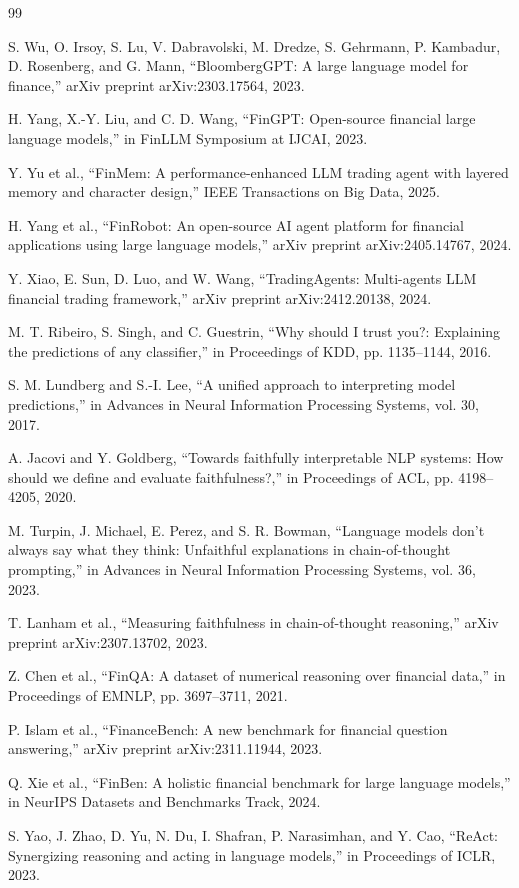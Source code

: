 \documentclass[12pt,a4paper]{article}
\begin{document}
\begin{thebibliography}{99}

S. Wu, O. Irsoy, S. Lu, V. Dabravolski, M. Dredze, S. Gehrmann, P. Kambadur, D. Rosenberg, and G. Mann, ``BloombergGPT: A large language model for finance,'' arXiv preprint arXiv:2303.17564, 2023.

H. Yang, X.-Y. Liu, and C. D. Wang, ``FinGPT: Open-source financial large language models,'' in FinLLM Symposium at IJCAI, 2023.

Y. Yu et al., ``FinMem: A performance-enhanced LLM trading agent with layered memory and character design,'' IEEE Transactions on Big Data, 2025.

H. Yang et al., ``FinRobot: An open-source AI agent platform for financial applications using large language models,'' arXiv preprint arXiv:2405.14767, 2024.

Y. Xiao, E. Sun, D. Luo, and W. Wang, ``TradingAgents: Multi-agents LLM financial trading framework,'' arXiv preprint arXiv:2412.20138, 2024.

M. T. Ribeiro, S. Singh, and C. Guestrin, ``Why should I trust you?: Explaining the predictions of any classifier,'' in Proceedings of KDD, pp. 1135--1144, 2016.

S. M. Lundberg and S.-I. Lee, ``A unified approach to interpreting model predictions,'' in Advances in Neural Information Processing Systems, vol. 30, 2017.

A. Jacovi and Y. Goldberg, ``Towards faithfully interpretable NLP systems: How should we define and evaluate faithfulness?,'' in Proceedings of ACL, pp. 4198--4205, 2020.

M. Turpin, J. Michael, E. Perez, and S. R. Bowman, ``Language models don't always say what they think: Unfaithful explanations in chain-of-thought prompting,'' in Advances in Neural Information Processing Systems, vol. 36, 2023.

T. Lanham et al., ``Measuring faithfulness in chain-of-thought reasoning,'' arXiv preprint arXiv:2307.13702, 2023.

Z. Chen et al., ``FinQA: A dataset of numerical reasoning over financial data,'' in Proceedings of EMNLP, pp. 3697--3711, 2021.

P. Islam et al., ``FinanceBench: A new benchmark for financial question answering,'' arXiv preprint arXiv:2311.11944, 2023.

Q. Xie et al., ``FinBen: A holistic financial benchmark for large language models,'' in NeurIPS Datasets and Benchmarks Track, 2024.

S. Yao, J. Zhao, D. Yu, N. Du, I. Shafran, P. Narasimhan, and Y. Cao, ``ReAct: Synergizing reasoning and acting in language models,'' in Proceedings of ICLR, 2023.

\end{thebibliography}
\end{document}
